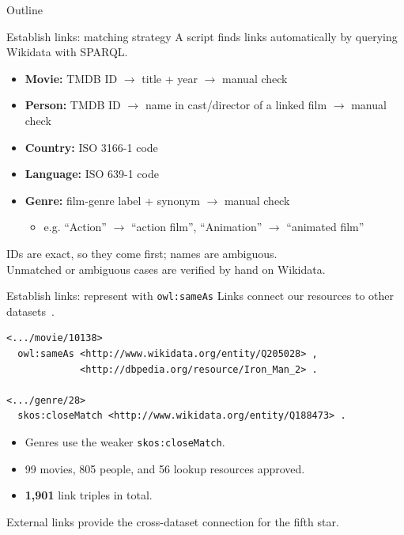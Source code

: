 \documentclass[aspectratio=169,xcolor=dvipsnames]{beamer}
\begin{document}
\begin{frame}{Outline}
    \tableofcontents[currentsection]
\end{frame}


\begin{frame}{Establish links: matching strategy}
\small
A script finds links automatically by querying Wikidata with SPARQL.
\medskip

\begin{itemize}
\item \textbf{Movie:} TMDB ID $\rightarrow$ title + year $\rightarrow$ manual check
\item \textbf{Person:} TMDB ID $\rightarrow$ name in cast/director of a linked film $\rightarrow$ manual check
\item \textbf{Country:} ISO 3166-1 code
\item \textbf{Language:} ISO 639-1 code
\item \textbf{Genre:} film-genre label + synonym $\rightarrow$ manual check
\begin{itemize}
\item e.g. ``Action'' $\rightarrow$ ``action film'', ``Animation'' $\rightarrow$ ``animated film''
\end{itemize}
\end{itemize}
\medskip
IDs are exact, so they come first; names are ambiguous.\\
Unmatched or ambiguous cases are verified by hand on Wikidata.
\end{frame}


\begin{frame}[fragile]{Establish links: represent with \texttt{owl:sameAs}}
\small
Links connect our resources to other datasets~\cite{bernerslee2006linkeddata}.
\begin{lstlisting}
<.../movie/10138>
  owl:sameAs <http://www.wikidata.org/entity/Q205028> ,
             <http://dbpedia.org/resource/Iron_Man_2> .

<.../genre/28>
  skos:closeMatch <http://www.wikidata.org/entity/Q188473> .
\end{lstlisting}
\begin{itemize}
\item Genres use the weaker \texttt{skos:closeMatch}.
\item 99 movies, 805 people, and 56 lookup resources approved.
\item \textbf{1,901} link triples in total.
\end{itemize}
External links provide the cross-dataset connection for the fifth star.
\end{frame}
\end{document}
